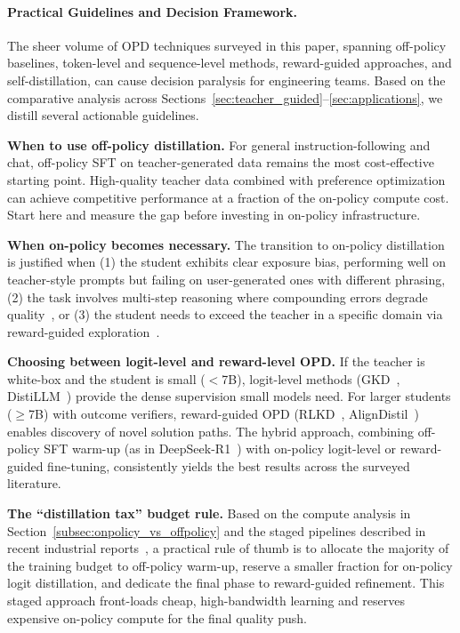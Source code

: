 \documentclass{article} %
\begin{document}
\paragraph{Practical Guidelines and Decision Framework.}
The sheer volume of OPD techniques surveyed in this paper, spanning off-policy baselines, token-level and sequence-level methods, reward-guided approaches, and self-distillation, can cause decision paralysis for engineering teams. Based on the comparative analysis across Sections~\ref{sec:teacher_guided}--\ref{sec:applications}, we distill several actionable guidelines.

\textbf{When to use off-policy distillation.} For general instruction-following and chat, off-policy SFT on teacher-generated data remains the most cost-effective starting point. High-quality teacher data combined with preference optimization~\citep{2503.02832} can achieve competitive performance at a fraction of the on-policy compute cost. Start here and measure the gap before investing in on-policy infrastructure.

\textbf{When on-policy becomes necessary.} The transition to on-policy distillation is justified when (1) the student exhibits clear exposure bias, performing well on teacher-style prompts but failing on user-generated ones with different phrasing, (2) the task involves multi-step reasoning where compounding errors degrade quality~\citep{ross2011reduction,2305.15717}, or (3) the student needs to exceed the teacher in a specific domain via reward-guided exploration~\citep{2602.12125}.

\textbf{Choosing between logit-level and reward-level OPD.} If the teacher is white-box and the student is small ($<$7B), logit-level methods (GKD~\citep{2306.13649}, DistiLLM~\citep{2402.03898}) provide the dense supervision small models need. For larger students ($\ge$7B) with outcome verifiers, reward-guided OPD (RLKD~\citep{2505.16142}, AlignDistil~\citep{2503.02832}) enables discovery of novel solution paths. The hybrid approach, combining off-policy SFT warm-up (as in DeepSeek-R1~\citep{2501.12948}) with on-policy logit-level or reward-guided fine-tuning, consistently yields the best results across the surveyed literature.

\textbf{The ``distillation tax'' budget rule.} Based on the compute analysis in Section~\ref{subsec:onpolicy_vs_offpolicy} and the staged pipelines described in recent industrial reports~\citep{2501.12948,2505.09388}, a practical rule of thumb is to allocate the majority of the training budget to off-policy warm-up, reserve a smaller fraction for on-policy logit distillation, and dedicate the final phase to reward-guided refinement. This staged approach front-loads cheap, high-bandwidth learning and reserves expensive on-policy compute for the final quality push.
\end{document}
